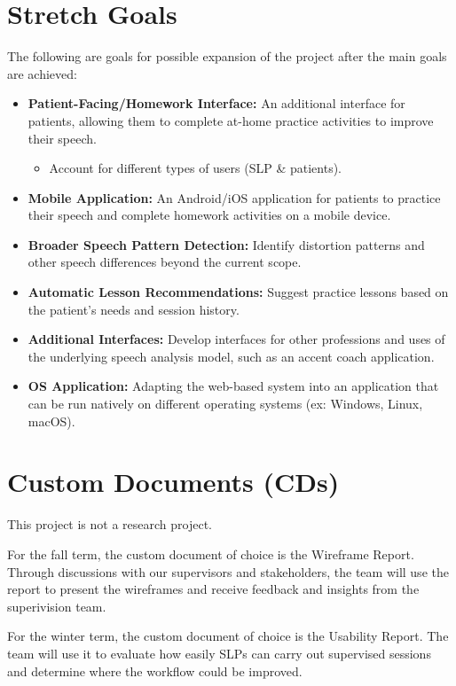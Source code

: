 \documentclass{article}
\begin{document}
\section{Stretch Goals}
The following are goals for possible expansion of the project after the main goals are achieved:
\begin{itemize}
    \item \textbf{Patient-Facing/Homework Interface:} An additional interface for patients, allowing them to complete at-home practice activities to improve their speech.
        \begin{itemize}
            \item Account for different types of users (SLP \& patients).
        \end{itemize}
    \item \textbf{Mobile Application:} An Android/iOS application for patients to practice their speech and complete homework activities on a mobile device.
    \item \textbf{Broader Speech Pattern Detection:} Identify distortion
      patterns and other speech differences beyond the current scope.
    \item \textbf{Automatic Lesson Recommendations:} Suggest practice
      lessons based on the patient's needs and session history.
    \item \textbf{Additional Interfaces:} Develop interfaces for other
      professions and uses of the underlying speech analysis model, such as
      an accent coach application.
    \item \textbf{OS Application:} Adapting the web-based system into an application that can be run natively on different operating systems (ex: Windows, Linux, macOS).
\end{itemize}

\section{Custom Documents (CDs)}

This project is not a research project. 

For the fall term, the custom document of choice is the
Wireframe Report. Through discussions with our
supervisors and stakeholders, the team will use the report to present the wireframes
and receive feedback and insights from the superivision team.

For the winter term, the custom document of choice is the Usability Report.
The team will use it to evaluate how easily SLPs can carry out supervised
sessions and determine where the workflow could be improved.
\end{document}
